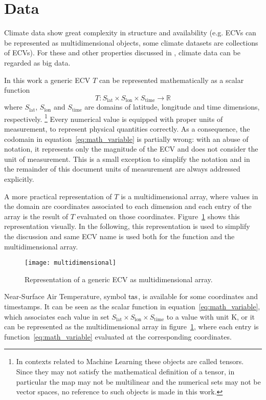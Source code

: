 \section{Data}
\label{sec:Data}
Climate data show great complexity in structure and availability (e.g. \glspl{ECV} can be represented as multidimensional objects, some climate datasets are collections of \glspl{ECV}). For these and other properties discussed in \cite{2014FaghmousABig}, climate data can be regarded as big data.

In this work a generic \gls{ECV} $T$ can be represented mathematically as a scalar function
\begin{equation}
  \label{eq:math_variable}
  T : S_\text{lat} \times S_\text{lon} \times S_\text{time} \to \mathbb{R}
\end{equation}
where $S_\text{lat}$, $S_\text{lon}$ and $S_\text{time}$ are domains of latitude, longitude and time dimensions, respectively.%
\footnote{In contexts related to Machine Learning these objects are called tensors. Since they may not satisfy the mathematical definition of a tensor, in particular the map may not be multilinear and the numerical sets may not be vector spaces, no reference to such objects is made in this work.}
Every numerical value is equipped with proper units of measurement, to represent physical quantities correctly. As a consequence, the codomain in equation~\eqref{eq:math_variable} is partially wrong: with an abuse of notation, it represents only the magnitude of the \gls{ECV} and does not consider the unit of measurement. This is a small exception to simplify the notation and in the remainder of this document units of measurement are always addressed explicitly.

A more practical representation of $T$ is a multidimensional array, where values in the domain are coordinates associated to each dimension and each entry of the array is the result of $T$ evaluated on those coordinates. Figure~\ref{fig:multidimensional} shows this representation visually. In the following, this representation is used to simplify the discussion and same \gls{ECV} name is used both for the function and the multidimensional array.
\begin{figure}[h]
  \centering
  \texttt{[image: multidimensional]}
  \caption{Representation of a generic \gls{ECV} as multidimensional array.}
  \label{fig:multidimensional}
\end{figure}

\begin{example}
  Near-Surface Air Temperature, symbol $\mathrm{tas}$, is available for some coordinates and timestamps. It can be seen as the scalar function in equation~\eqref{eq:math_variable}, which associates each value in set $S_\text{lat} \times S_\text{lon} \times S_\text{time}$ to a value with unit \unit{\kelvin}, or it can be represented as the multidimensional array in figure~\ref{fig:multidimensional}, where each entry is function~\eqref{eq:math_variable} evaluated at the corresponding coordinates.
\end{example}

